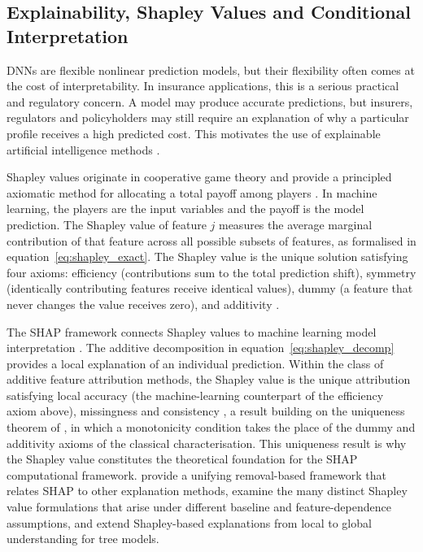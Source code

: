 
\subsection{Explainability, Shapley Values and Conditional Interpretation}
\label{sec:explainability_shapley_shap}

\noindent
DNNs are flexible nonlinear prediction models, but their flexibility often comes at the cost of interpretability. In insurance applications, this is a serious practical and regulatory concern. A model may produce accurate predictions, but insurers, regulators and policyholders may still require an explanation of why a particular profile receives a high predicted cost. This motivates the use of explainable artificial intelligence methods \citep{lundberg2017unified, molnar2022interpretable}.

\noindent
Shapley values originate in cooperative game theory and provide a principled axiomatic method for allocating a total payoff among players \citep{shapley1953value}. In machine learning, the players are the input variables and the payoff is the model prediction. The Shapley value of feature \(j\) measures the average marginal contribution of that feature across all possible subsets of features, as formalised in equation~\eqref{eq:shapley_exact}. The Shapley value is the unique solution satisfying four axioms: efficiency (contributions sum to the total prediction shift), symmetry (identically contributing features receive identical values), dummy (a feature that never changes the value receives zero), and additivity \citep{shapley1953value}.

\noindent
The SHAP framework connects Shapley values to machine learning model interpretation \citep{lundberg2017unified}. The additive decomposition in equation~\eqref{eq:shapley_decomp} provides a local explanation of an individual prediction. Within the class of additive feature attribution methods, the Shapley value is the unique attribution satisfying local accuracy (the machine-learning counterpart of the efficiency axiom above), missingness and consistency \citep[Theorem~1]{lundberg2017unified}, a result building on the uniqueness theorem of \citet{young1985monotonic}, in which a monotonicity condition takes the place of the dummy and additivity axioms of the classical characterisation. This uniqueness result is why the Shapley value constitutes the theoretical foundation for the SHAP computational framework.  \citet{covert2021explaining} provide a unifying removal-based framework that relates SHAP to other explanation methods, \citet{sundararajan2020many} examine the many distinct Shapley value formulations that arise under different baseline and feature-dependence assumptions, and \citet{lundberg2020local} extend Shapley-based explanations from local to global understanding for tree models.

